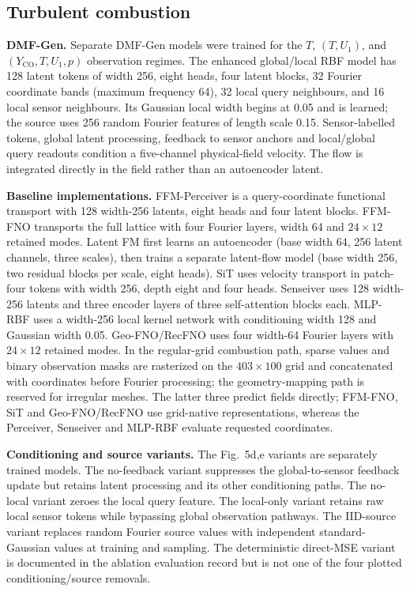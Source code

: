 \documentclass[11pt]{article}
\newcommand{\sisubsection}[1]{%
\FloatBarrier
\Needspace{5\baselineskip}%
\subsection{#1}%
}
\newcommand{\detail}[1]{\par\Needspace{4\baselineskip}\textbf{#1}\enspace}
\begin{document}
\sisubsection{Turbulent combustion}
\label{subsec:model-combustion}
\detail{DMF-Gen.}
{
Separate DMF-Gen models were trained for the $T$, $(T,U_1)$, and $(Y_{\mathrm{CO}},T,U_1,p)$ observation regimes. The enhanced global/local RBF model has 128 latent tokens of width 256, eight heads, four latent blocks, 32 Fourier coordinate bands (maximum frequency 64), 32 local query neighbours, and 16 local sensor neighbours. Its Gaussian local width begins at 0.05 and is learned; the source uses 256 random Fourier features of length scale 0.15. Sensor-labelled tokens, global latent processing, feedback to sensor anchors and local/global query readouts condition a five-channel physical-field velocity. The flow is integrated directly in the field rather than an autoencoder latent.
}
\detail{Baseline implementations.}
{
FFM-Perceiver is a query-coordinate functional transport with 128 width-256 latents, eight heads and four latent blocks. FFM-FNO transports the full lattice with four Fourier layers, width 64 and $24\times12$ retained modes. Latent FM first learns an autoencoder (base width 64, 256 latent channels, three scales), then trains a separate latent-flow model (base width 256, two residual blocks per scale, eight heads). SiT uses velocity transport in patch-four tokens with width 256, depth eight and four heads. Senseiver uses 128 width-256 latents and three encoder layers of three self-attention blocks each. MLP-RBF uses a width-256 local kernel network with conditioning width 128 and Gaussian width 0.05. Geo-FNO/RecFNO uses four width-64 Fourier layers with $24\times12$ retained modes. In the regular-grid combustion path, sparse values and binary observation masks are rasterized on the $403\times100$ grid and concatenated with coordinates before Fourier processing; the geometry-mapping path is reserved for irregular meshes. The latter three predict fields directly; FFM-FNO, SiT and Geo-FNO/RecFNO use grid-native representations, whereas the Perceiver, Senseiver and MLP-RBF evaluate requested coordinates.
}
\detail{Conditioning and source variants.}
{
The Fig.~5d,e variants are separately trained models. The no-feedback variant suppresses the global-to-sensor feedback update but retains latent processing and its other conditioning paths. The no-local variant zeroes the local query feature. The local-only variant retains raw local sensor tokens while bypassing global observation pathways. The IID-source variant replaces random Fourier source values with independent standard-Gaussian values at training and sampling. The deterministic direct-MSE variant is documented in the ablation evaluation record but is not one of the four plotted conditioning/source removals.
}
\end{document}
